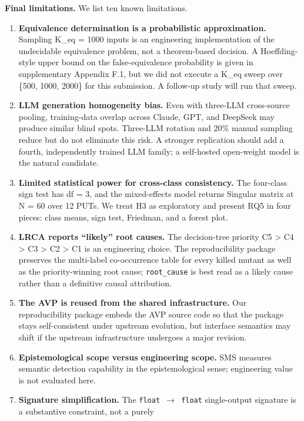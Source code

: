 \documentclass[manuscript,screen,review]{acmart}
\begin{document}
\textbf{Final limitations.} We list ten known limitations.

\begin{enumerate}
\item
  \textbf{Equivalence determination is a probabilistic approximation.}
  Sampling K\_eq = 1000 inputs is an engineering implementation of the
  undecidable equivalence problem, not a theorem-based decision. A
  Hoeffding-style upper bound on the false-equivalence probability is
  given in supplementary Appendix F.1, but we did not execute a K\_eq sweep over \{500, 1000, 2000\}
  for this submission. A follow-up study will run that sweep.
\item
  \textbf{LLM generation homogeneity bias.} Even with three-LLM
  cross-source pooling, training-data overlap across Claude, GPT, and
  DeepSeek may produce similar blind spots. Three-LLM rotation and 20\%
  manual sampling reduce but do not eliminate this risk. A stronger
  replication should add a fourth, independently trained LLM family; a
  self-hosted open-weight model is the natural candidate.
\item
  \textbf{Limited statistical power for cross-class consistency.} The
  four-class sign test has df = 3, and the mixed-effects model returns
  Singular matrix at N = 60 over 12 PUTs. We treat H3 as exploratory and
  present RQ5 in four pieces: class means, sign test, Friedman, and a
  forest plot.
\item
  \textbf{LRCA reports ``likely'' root causes.} The decision-tree
  priority C5 \textgreater{} C4 \textgreater{} C3 \textgreater{} C2
  \textgreater{} C1 is an engineering choice. The reproducibility
  package preserves the multi-label co-occurrence table for every killed
  mutant as well as the priority-winning root cause; \texttt{root\_cause}
  is best read as a likely cause rather than a definitive causal
  attribution.
\item
  \textbf{The AVP is reused from the shared infrastructure.} Our reproducibility package
  embeds the AVP source code so that the package stays self-consistent under upstream
  evolution, but interface semantics may shift if the upstream infrastructure undergoes a major
  revision.
\item
  \textbf{Epistemological scope versus engineering scope.} SMS measures
  semantic detection capability in the epistemological sense;
  engineering value is not evaluated here.
\item
  \textbf{Signature simplification.} The \texttt{float\ $\to$\ float}
  single-output signature is a substantive constraint, not a purely

\end{enumerate}
\end{document}
